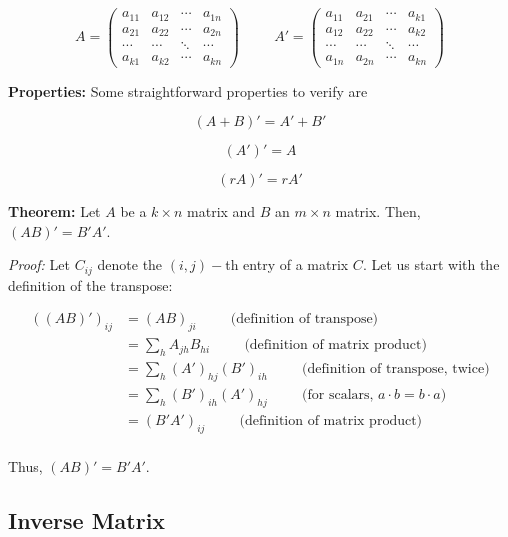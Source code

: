 \documentclass[11pt]{article}
\begin{document}
\[
A = \begin{pmatrix} a_{11} & a_{12} & \cdots & a_{1n} \\ a_{21} & a_{22} & \cdots & a_{2n} \\ \cdots & \cdots & \ddots & \cdots \\ a_{k1} & a_{k2} & \cdots & a_{kn} \end{pmatrix} \: \qquad \: A' = \begin{pmatrix} a_{11} & a_{21} & \cdots & a_{k1} \\ a_{12} & a_{22} & \cdots & a_{k2} \\ \cdots & \cdots & \ddots & \cdots \\ a_{1n} & a_{2n} & \cdots & a_{kn} \end{pmatrix}
\]

\textbf{Properties:} Some straightforward properties to verify are

\[
(A + B)' = A' + B'
\]

\[
\left(A'\right)' = A
\]

\[
\left(r A\right)' = r A'
\]

\textbf{Theorem:} Let \(A\) be a \(k\times n\) matrix and \(B\) an
\(m\times n\) matrix. Then, \((AB)' = B'A'\).

\emph{Proof:} Let \(C_{ij}\) denote the \((i,j)-\)th entry of a matrix
\(C\). Let us start with the definition of the transpose:

\[
\begin{align*}
\left((AB)'\right)_{ij} &= (AB)_{ji} \: \qquad \: \text{(definition of transpose)}\\
&= \sum_h A_{jh} B_{hi}  \: \qquad \: \text{(definition of matrix product)}\\ 
&= \sum_h \left(A'\right)_{hj} \left(B' \right)_{ih}  \: \qquad \: \text{(definition of transpose, twice)} \\
&= \sum_h \left(B' \right)_{ih}\left(A'\right)_{hj}  \: \qquad \: \text{(for scalars, $a \cdot b = b\cdot a$)} \\
&= \left(B'A'\right)_{ij} \: \qquad \: \text{(definition of matrix product)} \\
\end{align*}
\]

Thus, \((AB)' = B'A'\).

\hypertarget{inverse-matrix}{%
\subsection{Inverse Matrix}\label{inverse-matrix}}
\end{document}
